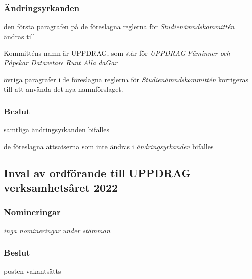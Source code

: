 \documentclass[protokoll]{dvd}
\begin{document}
    \subsubsection*{Ändringsyrkanden}
    \begin{attsatser}
        \item den första paragrafen på de föreslagna reglerna för \emph{Studienämndskommittén} ändras till
            \begin{displayquote}
                Kommitténs namn är UPPDRAG, som står för \emph{UPPDRAG Påminner och Påpekar Datavetare Runt Alla daGar}
            \end{displayquote}
        \item övriga paragrafer i de föreslagna reglerna för \emph{Studienämndskommittén} korrigeras till att använda det nya namnförslaget.
    \end{attsatser}

    \subsubsection*{Beslut}
    \begin{attsatser}
        \item samtliga ändringsyrkanden bifalles
        \item de föreslagna attsatserna som inte ändras i \emph{ändringsyrkanden} bifalles
    \end{attsatser}


\subsection{Inval av ordförande till UPPDRAG verksamhetsåret 2022}

    \subsubsection*{Nomineringar}

            \emph{inga nomineringar under stämman}

        \subsubsection*{Beslut}
            \begin{attsatser}
                \item posten vakantsätts
            \end{attsatser}

\newpage
\end{document}
